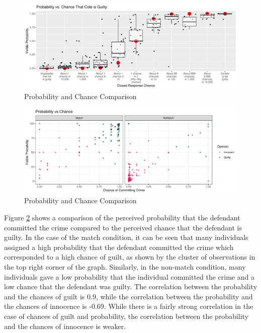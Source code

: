 \documentclass[print]{nuthesis}
\begin{document}
\begin{figure}

{\centering \includegraphics[width=\linewidth]{thesis_files/figure-latex/likeprob-1} 

}

\caption{Probability and Chance Comparison}\label{fig:likeprob}
\end{figure}

\begin{figure}

{\centering \includegraphics[width=\linewidth]{thesis_files/figure-latex/likeprobcon-1} 

}

\caption{Probability and Chance Comparison}\label{fig:likeprobcon}
\end{figure}

Figure \ref{fig:likeprobcon} shows a comparison of the perceived probability that the defendant committed the crime compared to the perceived chance that the defendant is guilty.
In the case of the match condition, it can be seen that many individuals assigned a high probability that the defendant committed the crime which corresponded to a high chance of guilt, as shown by the cluster of observations in the top right corner of the graph.
Similarly, in the non-match condition, many individuals gave a low probability that the individual committed the crime and a low chance that the defendant was guilty.
The correlation between the probability and the chances of guilt is 0.9,
while the correlation between the probability and the chances of innocence is -0.69.
While there is a fairly strong correlation in the case of chances of guilt and probability, the correlation between the probability and the chances of innocence is weaker.
\end{document}
